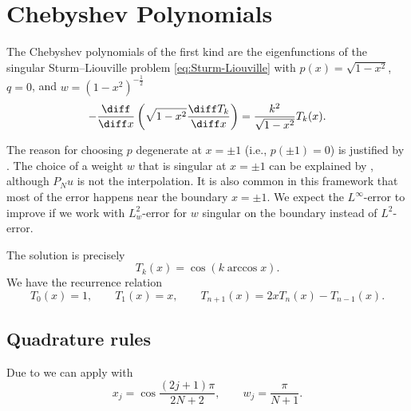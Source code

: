 \section{Chebyshev Polynomials}
\label{sec:Chebyshev polynomials}
The Chebyshev polynomials of the first kind are the eigenfunctions of the singular Sturm--Liouville problem \eqref{eq:Sturm-Liouville} with $p(x) = \sqrt{1-x^2}$, $q = 0$, and $w = (1-x^2)^{-\frac 1 2}$
\begin{equation*}
    -\frac{\diff}{\diff x} \left( \sqrt{1-x^2} \frac{\diff T_k}{\diff x} \right) =  \frac{k^2}{\sqrt{1-x^2}} T_k(x).
\end{equation*}

\begin{remark}
    The reason for choosing $p$ degenerate at $x = \pm 1$ (i.e., $p(\pm 1) = 0$) is justified by .
    The choice of a weight $w$ that is singular at $x = \pm 1$ can be explained by , although $P_N u$ is not the interpolation.
    It is also common in this framework that most of the error happens near the boundary $x = \pm 1$.
    We expect the $L^\infty$-error to improve if we work with $L^2_w$-error for $w$ singular on the boundary instead of $L^2$-error.
\end{remark}


The solution is precisely
\begin{equation}
    \label{eq:Chebyshev Tn}
    T_k (x) = \cos \left( k \arccos x \right).
\end{equation}
We have the recurrence relation
\begin{equation}
    \label{eq:Chebyshev recursion}
    T_0(x) = 1,
    \qquad
    T_1(x) = x,
    \qquad
    T_{n+1} (x) = 2x T_n(x) - T_{n-1}(x).
\end{equation}

\subsection{Quadrature rules}

\begin{example}[Gauss integration for the Chebyshev weight $w = (1 - x^2)^{-\frac 1 2}$]
    Due to  we can apply  with
    \begin{equation*}
        x_j = \cos \frac{(2j+1)\pi}{2N+2} , \qquad w_j = \frac{\pi}{N+1}.
    \end{equation*}
\end{example}

